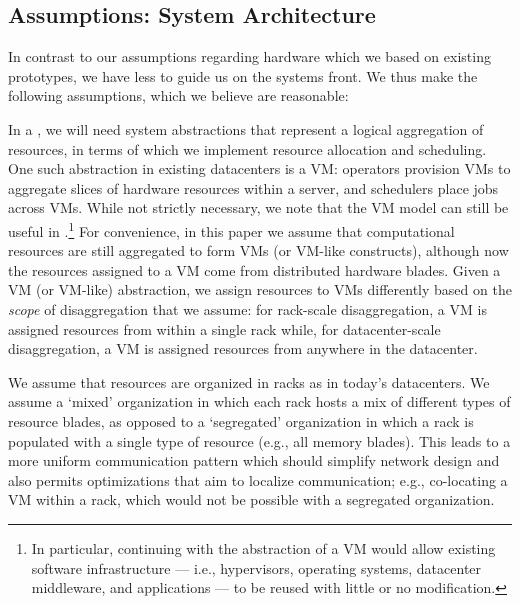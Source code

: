 \subsection{Assumptions: System Architecture}
\label{ssec:system}
In contrast to our assumptions regarding hardware which we based on existing  prototypes, we have less to guide us on the systems front. We thus make the following assumptions, which we believe are reasonable: 

In a \dis, we will need system abstractions that represent a logical aggregation of resources, in terms of which we implement resource allocation and scheduling. 
One such abstraction in existing datacenters is a VM: 
operators provision VMs to aggregate slices of hardware resources within a server, and schedulers place jobs across VMs. 
While not strictly necessary, we note that the VM model can still be useful in \dis.\footnote{In particular, continuing with the abstraction of a VM would allow existing software infrastructure --- i.e., hypervisors, operating systems, datacenter middleware, and applications --- to be reused with little or no modification.} 
For convenience, in this paper we assume that computational resources are still aggregated to form VMs (or VM-like constructs), although now the resources assigned to a VM come from distributed hardware blades. Given a VM (or VM-like) abstraction, we assign resources to VMs differently based on the \emph{scope} of disaggregation that we assume: for rack-scale disaggregation, a VM is assigned resources from within a single rack while, for datacenter-scale disaggregation, a VM is assigned resources from anywhere in the datacenter.

We assume that resources are organized in racks as in today's datacenters. 
We assume a `mixed' organization in which each rack hosts a mix of different types of resource blades, as opposed to a `segregated' organization in which a rack is populated with a single type of resource (e.g., all memory blades). 
This leads to a more uniform communication pattern which should simplify network design and also permits optimizations that aim to localize communication; e.g., co-locating a VM within a rack, which would not be possible with a segregated organization. 

